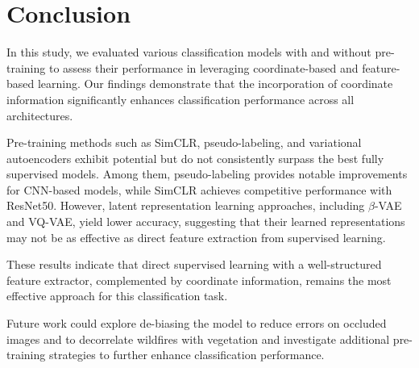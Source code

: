 \documentclass{article}
\begin{document}
\section{Conclusion}

In this study, we evaluated various classification models with and without
pre-training to assess their performance in leveraging coordinate-based and
feature-based learning. Our findings demonstrate that the incorporation of
coordinate information significantly enhances classification performance across
all architectures.

Pre-training methods such as SimCLR, pseudo-labeling, and variational
autoencoders exhibit potential but do not consistently surpass the best fully
supervised models. Among them, pseudo-labeling provides notable improvements
for CNN-based models, while SimCLR achieves competitive performance with
ResNet50. However, latent representation learning approaches, including
$\beta$-VAE and VQ-VAE, yield lower accuracy, suggesting that their learned
representations may not be as effective as direct feature extraction from
supervised learning.

These results indicate that direct supervised learning with a well-structured
feature extractor, complemented by coordinate information, remains the most
effective approach for this classification task.

Future work could explore de-biasing the model to reduce errors on occluded
images and to decorrelate wildfires with vegetation and investigate additional
pre-training strategies to further enhance classification performance.



\end{document}
